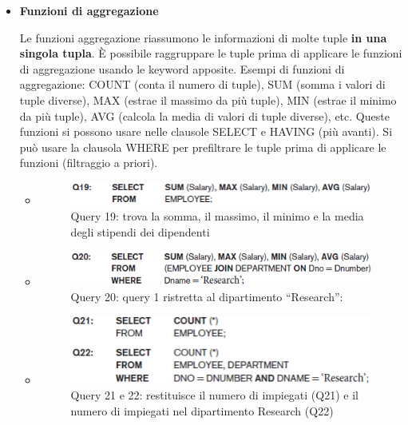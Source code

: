 \begin{itemize}
\item{\textbf{Funzioni di aggregazione}}

Le funzioni aggregazione riassumono le informazioni di molte tuple \textbf{in una singola tupla}. È possibile raggruppare le tuple prima di applicare le funzioni di aggregazione usando le keyword apposite. Esempi di funzioni di aggregazione: COUNT (conta il numero di tuple), SUM (somma i valori di tuple diverse), MAX (estrae il massimo da più tuple), MIN (estrae il minimo da più tuple), AVG (calcola la media di valori di tuple diverse), etc. Queste funzioni si possono usare nelle clausole SELECT e HAVING (più avanti). Si può usare la clausola WHERE per prefiltrare le tuple prima di applicare le funzioni (filtraggio a priori). 

\begin{itemize}

\item
\begin{center}
\begin{figure}[H]
\centering
\includegraphics[scale=1]{figures/sum_maxmin_avg.png}
\caption{Query 19: trova la somma, il massimo, il minimo e la media degli stipendi dei dipendenti} 
\end{figure}
\end{center}

\item
\begin{center}
\begin{figure}[H]
\centering
\includegraphics[scale=1]{figures/sum_maxmin_avg2.png}
\caption{Query 20: query 1 ristretta al dipartimento “Research”:} 
\end{figure}
\end{center}

\item
\begin{center}
\begin{figure}[H]
\centering
\includegraphics[scale=1]{figures/COUNT.png}
\caption{Query 21 e 22: restituisce il numero di impiegati (Q21) e il numero di impiegati nel dipartimento Research (Q22)} 
\end{figure}
\end{center}


\end{itemize}
\end{itemize}
